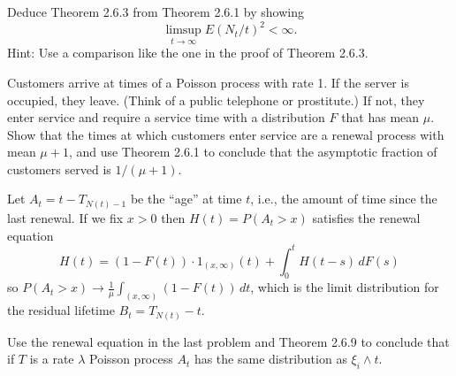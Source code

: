   \begin{exercise}[Durrett 2.6.2]
    Deduce Theorem 2.6.3 from Theorem 2.6.1 by showing
    \begin{equation*}
      \limsup_{t \to \infty} E(N_t/t)^2 < \infty.
    \end{equation*}
    Hint: Use a comparison like the one in the proof of Theorem 2.6.3.
  \end{exercise}
  \begin{solution}

  \end{solution}

  \begin{exercise}[Durrett 2.6.3]
    Customers arrive at times of a Poisson process with rate 1. If the server is occupied, they leave. (Think of a public telephone or prostitute.) If not, they enter service and require a service time with a distribution $F$ that has mean $\mu$. Show that the times at which customers enter service are a renewal process with mean $\mu+1$, and use Theorem 2.6.1 to conclude that the asymptotic fraction of customers served is $1/(\mu+1)$.
  \end{exercise}
  \begin{solution}

  \end{solution}

  \begin{exercise}[Durrett 2.6.4]
    Let $A_t = t - T_{N(t)-1}$ be the ``age'' at time $t$, i.e., the amount of time since the last renewal. If we fix $x > 0$ then $H(t) = P(A_t > x)$ satisfies the renewal equation
    \begin{equation*}
      H(t) = (1 - F(t)) \cdot 1_{(x, \infty)}(t) + \int_0^t H(t - s) \, dF(s)
    \end{equation*}
    so $P(A_t > x) \to \frac{1}{\mu} \int_{(x, \infty)} (1 - F(t)) \, dt$, which is the limit distribution for the residual lifetime $B_t = T_{N(t)} - t$.
  \end{exercise}
  \begin{solution}

  \end{solution}

  \begin{exercise}[Durrett 2.6.5]
    Use the renewal equation in the last problem and Theorem 2.6.9 to conclude that if $T$ is a rate $\lambda$ Poisson process $A_t$ has the same distribution as $\xi_i \wedge t$.
  \end{exercise}
  \begin{solution}

  \end{solution}

